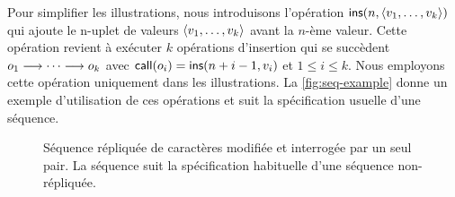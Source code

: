 Pour simplifier les illustrations, nous introduisons l'opération $\trm{ins}(n, \tuple*{v_1,\dotsc,v_k})$ qui ajoute le n-uplet de valeurs $\tuple*{v_1,\dotsc,v_k}$ avant la $n$-ème valeur.
Cette opération revient à exécuter $k$ opérations d'insertion qui se succèdent $o_1 \pre \dotsb \pre o_k$ avec $\trm{call}(o_i) = \trm{ins}(n+i-1, v_i)$ et $1 \leq i \leq k$.
Nous employons cette opération uniquement dans les illustrations.
La \autoref{fig:seq-example} donne un exemple d'utilisation de ces opérations et suit la spécification usuelle d'une séquence.

\begin{figure}[htb]
    \newcommand*\hsep{2.4}
    \centering
    \caption[Séquence répliquée de caractères modifiée et interrogée par un seul pair]{Séquence répliquée de caractères modifiée et interrogée par un seul pair.
    La séquence suit la spécification habituelle d'une séquence non-répliquée.}\label{fig:seq-example}
\end{figure}

